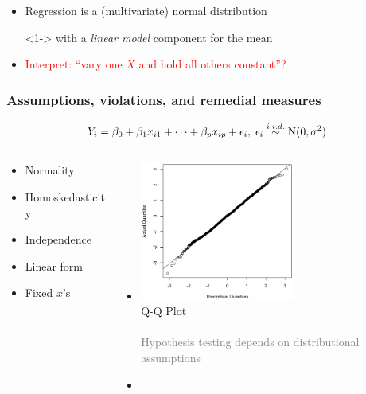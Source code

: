 \documentclass[xcolor={dvipsnames}]{beamer}
\begin{document}
{\begin{itemize}
\item[]
\item<1-> Regression is a (multivariate) normal distribution 
\item[]<1-> with a \emph{linear model} component for the mean 
\item[]
\item<2-> %
\textcolor{red}{Interpret: ``vary one $X$ and hold all others constant''?}
\end{itemize}

}




\frame
{
 \frametitle{Assumptions, violations, and remedial measures}

\vspace{-1in}

$$Y_i = \beta_0+\beta_1x_{i1} + \cdots + \beta_px_{ip} + \epsilon_i,  \;  \epsilon_i \overset{\tiny i.i.d.}{\sim} \textrm{N}(0,\sigma^2)$$
 
\begin{columns}
\begin{column}{.33\textwidth}
\begin{itemize}
\item<2-> Normality
\item<4-> Homoskedasticity
\item<6-> Independence
\item<7-> Linear form
\item<8-> Fixed $x$'s
\end{itemize}
\end{column}
\begin{column}{.67\textwidth}
\begin{itemize}
\item<2-3> [] 
\includegraphics[width=2in]{stuff/qq1.png}\\ %
Q-Q Plot\\${}$\\
\textcolor{gray}{Hypothesis testing depends on distributional assumptions}
\vspace{-2.64in}
\item<2>[] 


\end{itemize}
\end{column}
\end{columns}}
\end{document}
